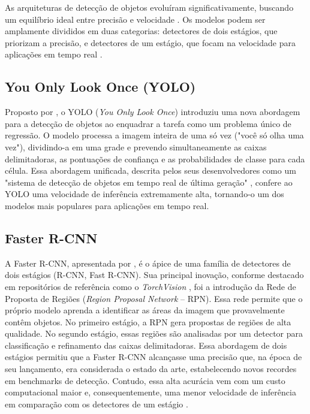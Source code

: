 As arquiteturas de detecção de objetos evoluíram significativamente, buscando um equilíbrio
ideal entre precisão e velocidade \cite{tan2020efficientdet}. Os modelos podem ser amplamente
divididos em duas categorias: detectores de dois estágios, que priorizam a precisão, e
detectores de um estágio, que focam na velocidade para aplicações em tempo real
\cite{lin2020focal}.

\subsection{You Only Look Once (YOLO)}

Proposto por , o YOLO (\textit{You Only Look Once}) introduziu uma
nova abordagem para a detecção de objetos ao enquadrar a tarefa como um problema único de
regressão. O modelo processa a imagem inteira de uma só vez ("você só olha uma vez"),
dividindo-a em uma grade e prevendo simultaneamente as caixas delimitadoras, as pontuações de
confiança e as probabilidades de classe para cada célula. Essa abordagem unificada, descrita
pelos seus desenvolvedores como um "sistema de detecção de objetos em tempo real de última
geração" \cite{ultralytics2024yolo}, confere ao YOLO uma velocidade de inferência
extremamente alta, tornando-o um dos modelos mais populares para aplicações em tempo real.

\subsection{Faster R-CNN}

A Faster R-CNN, apresentada por , é o ápice de uma família de
detectores de dois estágios (R-CNN, Fast R-CNN). Sua principal inovação, conforme destacado em
repositórios de referência como o \textit{TorchVision} \cite{torchvision2024}, foi a
introdução da Rede de Proposta de Regiões (\textit{Region Proposal Network} -- RPN). Essa rede
permite que o próprio modelo aprenda a identificar as áreas da imagem que provavelmente contêm
objetos. No primeiro estágio, a RPN gera propostas de regiões de alta qualidade. No segundo
estágio, essas regiões são analisadas por um detector para classificação e refinamento das
caixas delimitadoras. Essa abordagem de dois estágios permitiu que a Faster R-CNN alcançasse
uma precisão que, na época de seu lançamento, era considerada o estado da arte, estabelecendo
novos recordes em benchmarks de detecção. Contudo, essa alta acurácia vem com um custo
computacional maior e, consequentemente, uma menor velocidade de inferência em comparação com
os detectores de um estágio \cite{ren2017faster}.

